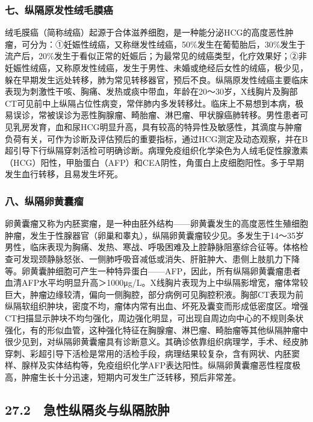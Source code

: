 \subsubsection{七、纵隔原发性绒毛膜癌}

绒毛膜癌（简称绒癌）起源于合体滋养细胞，是一种能分泌HCG的高度恶性肿瘤，可分为：①妊娠性绒癌，又称继发性绒癌，50\%发生在葡萄胎后，30\%发生于流产后，20\%发生于看似正常的妊娠后；为最常见的绒癌类型，化疗效果好；②非妊娠性绒癌，又称原发性绒癌，发生于男性、未婚或绝经后女性的绒癌，极少见，躲在早期发生远处转移，肺为常见转移器官，预后不良。纵隔原发性绒癌主要临床表现为刺激性干咳、胸痛、发热或痰中带血，年龄在20～30岁，X线胸片及胸部CT可见前中上纵隔占位性病变，常伴肺内多发转移灶。临床上不易想到本病，极易误诊，常被误诊为恶性胸腺瘤、畸胎瘤、淋巴瘤、甲状腺癌肺转移。男性患者可见乳房发育，血和尿HCG明显升高，具有较高的特异性及敏感性，其滴度与肿瘤负荷有关，可作为诊断及评估预后的重要指标，通过HCG测定及动态观察，并在B超引导下行纵隔穿刺活检可明确诊断。病理免疫组织化学染色为人绒毛促性腺激素（HCG）阳性，甲胎蛋白（AFP）和CEA阴性，角蛋白上皮细胞阳性。多于早期发生血行转移，且易发生坏死。

\subsubsection{八、纵隔卵黄囊瘤}

卵黄囊瘤又称为内胚窦瘤，是一种由胚外结构------卵黄囊发生的高度恶性生殖细胞肿瘤，发生于性腺器官（卵巢和睾丸），纵隔卵黄囊瘤较少见。多发生于14～35岁男性，临床表现为胸痛、发热、寒战、呼吸困难及上腔静脉阻塞综合征等。体格检查可发现颈静脉怒张、一侧肺呼吸音减低或消失、肝脏肿大、患侧上肢肌力下降等。卵黄囊肿细胞可产生一种特异蛋白------AFP，因此，所有纵隔卵黄囊瘤患者血清AFP水平均明显升高＞1000μg/L。X线胸片表现为上中纵隔影增宽，瘤体常较巨大，肿瘤边缘较清，偏向一侧胸腔，部分病例可见胸腔积液。胸部CT表现为前纵隔软组织肿块，密度不均，瘤体内常有出血、坏死及囊变而形成低密度区。增强CT扫描显示肿块不均匀强化，周边强化明显，可出现自周边向中心的不规则条状强化，有的形似血管，这种强化特征在胸腺瘤、淋巴瘤、畸胎瘤等其他纵隔肿瘤中很少见到，对纵隔卵黄囊瘤具有诊断意义。其确诊依靠组织病理学，手术、经皮肺穿刺、彩超引导下活检是常用的活检手段，病理结果较复杂，含有网状、内胚窦样、腺样及实体结构等，免疫组织化学AFP表达阳性。纵隔卵黄囊瘤恶性程度极高，肿瘤生长十分迅速，短期内可发生广泛转移，预后非常差。

\subsection{27.2　急性纵隔炎与纵隔脓肿}


